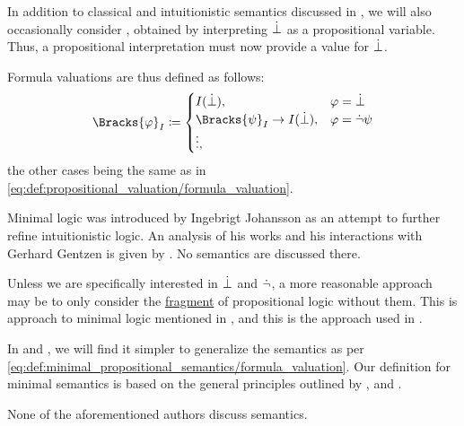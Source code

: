\begin{definition}\label{def:minimal_propositional_semantics}\mimprovised
  In addition to classical and intuitionistic semantics discussed in , we will also occasionally consider , obtained by interpreting \( \dot{\bot} \) as a propositional variable. Thus, a propositional interpretation must now provide a value for \( \dot{\bot} \).

  Formula valuations are thus defined as follows:
  \begin{equation}\label{eq:def:minimal_propositional_semantics/formula_valuation}
    \Bracks{\varphi}_I \coloneqq \begin{cases}
      I(\synbot),                             &\varphi = \synbot \\
      \Bracks{\psi}_I \rightarrow I(\synbot), &\varphi = \synneg \psi \\
      \vdots,                                 &
    \end{cases}
  \end{equation}
  the other cases being the same as in \eqref{eq:def:propositional_valuation/formula_valuation}.
\end{definition}
\begin{comments}
  \item Minimal logic was introduced by Ingebrigt Johansson as an attempt to further refine intuitionistic logic. An analysis of his works and his interactions with Gerhard Gentzen is given by . No semantics are discussed there.

  Unless we are specifically interested in \( \dot{\bot} \) and \( \dot{\neg} \), a more reasonable approach may be to only consider the \hyperref[con:syntax_fragment]{fragment} of propositional logic without them. This is approach to minimal logic mentioned in , and this is the approach used in .

  In  and , we will find it simpler to generalize the semantics as per \eqref{eq:def:minimal_propositional_semantics/formula_valuation}. Our definition for minimal semantics is based on the general principles outlined by ,  and .

  None of the aforementioned authors discuss semantics.
\end{comments}

